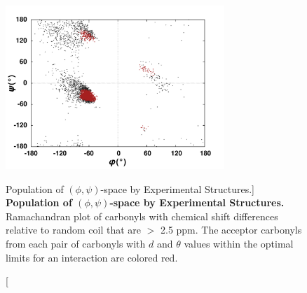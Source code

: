 \begin{figure}
\includegraphics[width=3.25in]{figs/npistar/05-rama.png}
\caption
      [Population of $(\phi,\psi)$-space by Experimental Structures.]{
  {\bf Population of $(\phi,\psi)$-space by Experimental Structures.}
  \\
  Ramachandran plot of carbonyls with \cnmr{} chemical shift differences
  relative to random coil that are $>$ 2.5 ppm. The acceptor carbonyls from
  each pair of carbonyls with $d$ and $\theta$ values within the optimal
  limits for an \npistar{} interaction are colored red.
}
\label{figure.11.5}
\end{figure}

